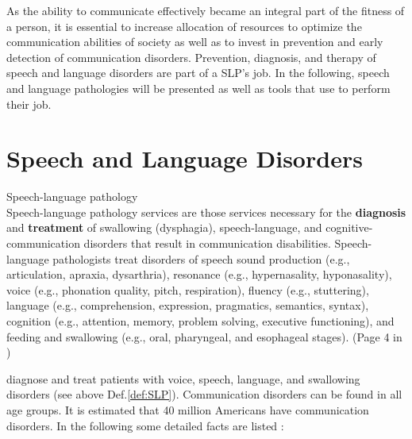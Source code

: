 As the ability to communicate effectively became an integral part of the fitness of a person, it is essential to increase allocation of resources to optimize the communication abilities of society as well as to invest in prevention and early detection of communication disorders. Prevention, diagnosis, and therapy of speech and language disorders are part of a SLP's job. In the following, speech and language pathologies will be presented as well as tools that  use to perform their job.

\section{Speech and Language Disorders}
\label{sec:SLP}

\theoremstyle{definition}
\begin{definition}{Speech-language pathology\\}
Speech-language pathology services are those services necessary for the \textbf{diagnosis} and \textbf{treatment} of swallowing (\gls{dysphagia}), speech-language, and cognitive-communication disorders that result in communication disabilities. Speech-language pathologists treat disorders of speech sound production (e.g., articulation, \gls{apraxia}, \gls{dysarthria}), resonance (e.g., hypernasality, hyponasality), voice (e.g., phonation quality, pitch, respiration), fluency (e.g., stuttering), language (e.g., comprehension, expression, pragmatics, semantics, syntax), cognition (e.g., attention, memory, problem solving, executive functioning), and feeding and swallowing (e.g., oral, pharyngeal, and esophageal stages). (Page 4 in \cite{SLPathologies})
\label{def:SLP}
\end{definition}

 diagnose and treat patients with voice, speech, language, and swallowing disorders (see above Def.\ref{def:SLP}). Communication disorders can be found in all age groups. It is estimated that 40 million Americans have communication disorders. In the following some detailed facts are listed \cite{SLPathologies}:

